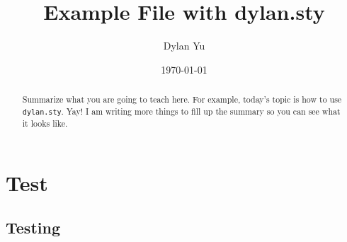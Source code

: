 \documentclass[twoside]{article}
\title{Example File with dylan.sty}
\author{Dylan Yu}
\date{\today}
\begin{document}
\maketitle

\begin{abstract}
Summarize what you are going to teach here. For example, today's topic is how to use \verb|dylan.sty|. Yay! I am writing more things to fill up the summary so you can see what it looks like.
\end{abstract}

\tableofcontents
\newpage

\section{Test}
\subsection{Testing}
\end{document}
